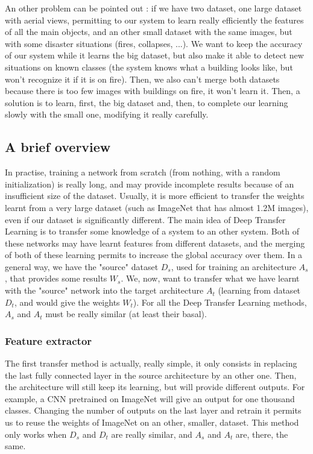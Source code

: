 An other problem can be pointed out : if we have two dataset, one large dataset with aerial views, permitting to our system to learn really efficiently the features of all the main objects, and an other small dataset with the same images, but with some disaster situations (fires, collapses, ...). We want to keep the accuracy of our system while it learns the big dataset, but also make it able to detect new situations on known classes (the system knows what a building looks like, but won't recognize it if it is on fire). Then, we also can't merge both datasets because there is too few images with buildings on fire, it won't learn it. Then, a solution is to learn, first, the big dataset and, then, to complete our learning slowly with the small one, modifying it really carefully.


\subsection{A brief overview}
In practise, training a network from scratch (from nothing, with a random initialization) is really long, and may provide incomplete results because of an insufficient size of the dataset. Usually, it is more efficient to transfer the weights learnt from a very large dataset (such as ImageNet that has almost 1.2M images), even if our dataset is significantly different. The main idea of Deep Transfer Learning is to transfer some knowledge of a system to an other system. Both of these networks may have learnt features from different datasets, and the merging of both of these learning permits to increase the global accuracy over them. In a general way, we have the "source" dataset $D_s$, used for training an architecture $A_s$, that provides some results $W_s$. We, now, want to transfer what we have learnt with the "source" network into the target architecture $A_t$ (learning from dataset $D_t$, and would give the weights $W_t$). For all the Deep Transfer Learning methods, $A_s$ and $A_t$ must be really similar (at least their basal).

\subsubsection{Feature extractor}
The first transfer method is actually, really simple, it only consists in replacing the last fully connected layer in the source architecture by an other one. Then, the architecture will still keep its learning, but will provide different outputs. For example, a CNN pretrained on ImageNet will give an output for one thousand classes. Changing the number of outputs on the last layer and retrain it permits us to reuse the weights of ImageNet on an other, smaller, dataset. This method only works when $D_s$ and $D_t$ are really similar, and $A_s$ and $A_t$ are, there, the same.

